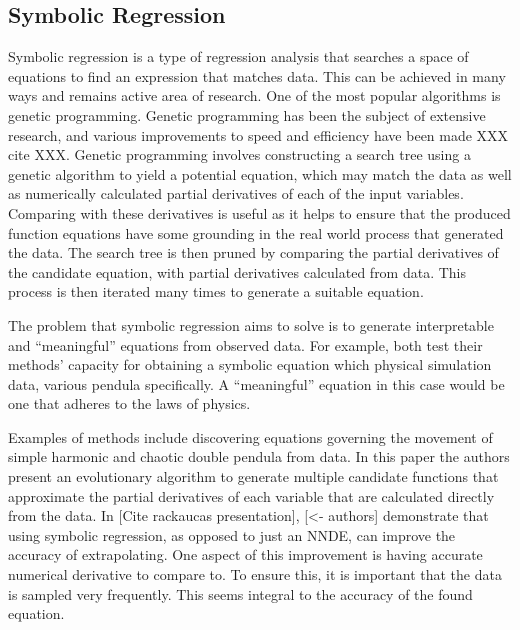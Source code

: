 \documentclass[12pt]{amsart}
\begin{document}
\subsection{Symbolic Regression}
    Symbolic regression is a type of regression analysis that searches a space of equations to find an expression that matches data. This can be achieved in many ways and remains active area of research. One of the most popular algorithms is genetic programming\cite{schmidt2009distilling}. Genetic programming has been the subject of extensive research, and various improvements to speed and efficiency have been made XXX cite XXX. Genetic programming involves constructing a search tree using a genetic algorithm to yield a potential equation, which may match the data as well as numerically calculated partial derivatives of each of the input variables. Comparing with these derivatives is useful as it helps to ensure that the produced function equations have some grounding in the real world process that generated the data. The search tree is then pruned by comparing the partial derivatives of the candidate equation, with partial derivatives calculated from data. This process is then iterated many times to generate a suitable equation.

    The problem that symbolic regression aims to solve is to generate interpretable and ``meaningful'' equations from observed data. For example, both \cite{schmidt2009distilling,bongard2007automated} test their methods' capacity for obtaining a symbolic equation which physical simulation data, various pendula specifically. A ``meaningful'' equation in this case would be one that adheres to the laws of physics.


    Examples of methods include discovering equations governing the movement of simple harmonic and chaotic double pendula from data\cite{schmidt2009distilling}. In this paper the authors present an evolutionary algorithm to generate multiple candidate functions that approximate the partial derivatives of each variable that are calculated directly from the data. In [Cite rackaucas presentation], [<- authors] demonstrate that using symbolic regression, as opposed to just an NNDE, can improve the accuracy of extrapolating. One aspect of this improvement is having accurate numerical derivative to compare to. To ensure this, it is important that the data is sampled very frequently. This seems integral to the accuracy of the found equation. 
    
\end{document}
